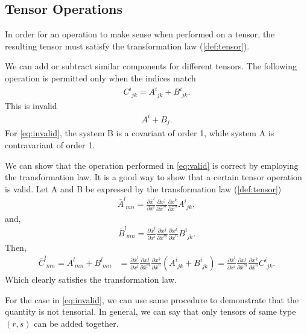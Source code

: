 \documentclass[main.tex]{subfiles}
\begin{document}
\subsection{Tensor Operations}
In order for an operation to make sense when performed on a tensor, the resulting 
tensor must satisfy the transformation law (\ref{def:tensor}).
\begin{example}
We can add or subtract similar components for different tensors. The following operation is 
permitted only when the indices match 
\begin{align} \label{eq:valid}
C^i_{\phantom{i}jk} = A^i_{\phantom{i}jk} + B^i_{\phantom{i}jk}.
\end{align}
This is invalid
\begin{align} \label{eq:invalid}
A^i + B_j.
\end{align}
For \eqref{eq:invalid}, the system B is a covariant of order 1, while system A is 
contravariant of order 1. 

We can show that the operation performed in \eqref{eq:valid} 
is correct by employing the transformation law. It is a good way to show that a certain 
tensor operation is valid. Let A and B be expressed by the transformation law (\ref{def:tensor})
\begin{align}
\bar{A}^l_{\phantom{l}mn} = 
\frac{\partial\bar{x}^l}{\partial x^i}\frac{\partial x^j}{\partial\bar{x}^m}
\frac{\partial x^k}{\partial\bar{x}^n} A^i_{\phantom{i}jk},
\end{align}
and,
\begin{align}
\overline{B}^l_{\phantom{l}mn} = 
\frac{\partial\bar{x}^l}{\partial x^i}\frac{\partial x^j}{\partial\bar{x}^m}
\frac{\partial x^k}{\partial\bar{x}^n}B^i_{\phantom{i}jk}.
\end{align}
Then,
\begin{align*}
 \overline{C}^l_{\phantom{l}mn} = A^l_{\phantom{l}mn} + B^l_{\phantom{l}mn} &= 
\frac{\partial\bar{x}^l}{\partial x^i}\frac{\partial x^j}{\partial\bar{x}^m}
\frac{\partial x^k}{\partial\bar{x}^n} \left(A^i_{\phantom{i}jk} + B^i_{\phantom{i}jk}\right)
= \frac{\partial\bar{x}^l}{\partial x^i}\frac{\partial x^j}{\partial\bar{x}^m}
\frac{\partial x^k}{\partial\bar{x}^n} C^i_{\phantom{i}jk}.
\end{align*}
Which clearly satisfies the transformation law. 

For the case in \eqref{eq:invalid}, 
we can use same procedure to demonstrate that the quantity is not tensorial.
In general, we can say that only tensors of same type $(r,s)$ can be added together.
\\


\end{example}
\end{document}
